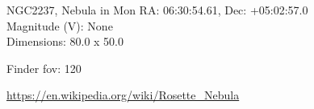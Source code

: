 \begin{block}{NGC2237, Nebula in Mon}
    RA: 06:30:54.61, Dec: +05:02:57.0 \\ 
    Magnitude (V): None \\ 
    Dimensions: 80.0 x 50.0 

    Finder fov: 120 

    \url{https://en.wikipedia.org/wiki/Rosette_Nebula} 
\end{block}